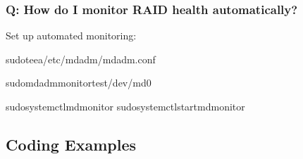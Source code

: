 \documentclass[letterpaper,10pt,english]{sphinxmanual}
\begin{document}
\subsubsection{Q: How do I monitor RAID health automatically?}
\label{\detokenize{raid-systems:q-how-do-i-monitor-raid-health-automatically}}
\sphinxAtStartPar
{} Set up automated monitoring:

\begin{sphinxVerbatim}[commandchars=\\\{\}]
sudotee\PYGZhy{}a/etc/mdadm/mdadm.conf

sudomdadm\PYGZhy{}\PYGZhy{}monitor\PYGZhy{}\PYGZhy{}test/dev/md0

sudosystemctlmdmonitor
sudosystemctlstartmdmonitor
\end{sphinxVerbatim}


\subsection{Coding Examples}
\label{\detokenize{raid-systems:coding-examples}}
\end{document}
